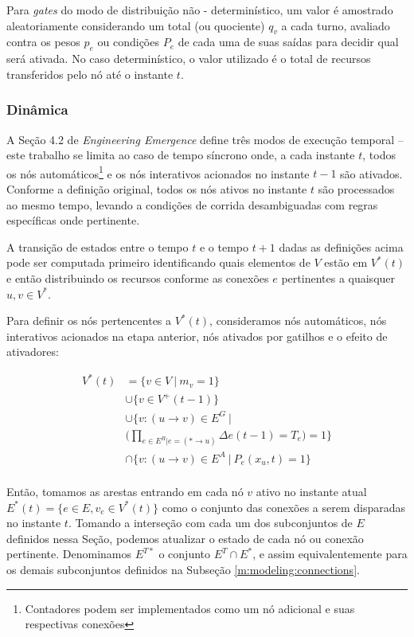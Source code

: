 \documentclass[10pt,a4paper]{article}
\begin{document}
Para \textit{gates} do modo de distribuição não - determinístico, um valor é amostrado aleatoriamente considerando um total (ou quociente) $q_v$ a cada turno, avaliado contra os pesos $p_e$ ou condições $P_e$ de cada uma de suas saídas para decidir qual será ativada. No caso determinístico, o valor utilizado é o total de recursos transferidos pelo nó até o instante $t$.

\subsubsection{Dinâmica}
\label{m:modeling:dynamics}
A Seção 4.2 de \textit{Engineering Emergence} define três modos de execução temporal -- este trabalho se limita ao caso de tempo síncrono onde, a cada instante $t$, todos os nós automáticos\footnote{Contadores podem ser implementados como um nó adicional e suas respectivas conexões} e os nós interativos acionados no instante $t-1$ são ativados. Conforme a definição original, todos os nós ativos no instante $t$ são processados ao mesmo tempo, levando a condições de corrida desambiguadas com regras específicas onde pertinente.

A transição de estados entre o tempo $t$ e o tempo $t+1$ dadas as definições acima pode ser computada primeiro identificando quais elementos de $V$ estão em $V^*(t)$ e então distribuindo os recursos conforme as conexões $e$ pertinentes a quaisquer $u,v \in V^*$.

Para definir os nós pertencentes a $V^*(t)$, consideramos nós automáticos, nós interativos acionados na etapa anterior, nós ativados por gatilhos e o efeito de ativadores:

\begin{align*}
    V^*(t) &= \{v \in V \ | \ m_v = 1\}\\& \cup \{v \in V^+(t-1)\}\\
    & \cup \{v: (u \rightarrow v) \in E^G\ | \\\
    &\Big(\prod_{e \in E^R | e = (* \rightarrow u)}{\Delta e(t-1) = T_e \Big)} = 1 \}\\
    &\cap \{v: (u \rightarrow v) \in E^A\ | \ P_e(x_u, t) = 1 \}\\
\end{align*}

Então, tomamos as arestas entrando em cada nó $v$ ativo no instante atual $E^*(t) = \{e \in E, v_e \in V^*(t)\}$ como o conjunto das conexões a serem disparadas no instante $t$. Tomando a interseção com cada um dos subconjuntos de $E$ definidos nessa Seção, podemos atualizar o estado de cada nó ou conexão pertinente. Denominamos $E^{T*}$ o conjunto $E^T \cap E^*$, e assim equivalentemente para os demais subconjuntos definidos na Subseção \ref{m:modeling:connections}.
\end{document}
